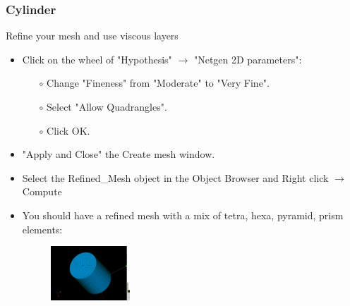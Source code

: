 \documentclass[10pt]{beamer}
\begin{document}
\begin{frame}
\frametitle{Cylinder}
\begin{block}{Refine your mesh and use viscous layers}

\begin{itemize}
\item Click on the wheel of "Hypothesis" $\rightarrow$ "Netgen 2D parameters":
    \begin{itemize}
    \item [$\circ$] Change "Fineness" from "Moderate" to "Very Fine".
    \item [$\circ$] Select "Allow Quadrangles".
    \item [$\circ$] Click OK.
    \end{itemize}
\item "Apply and Close" the Create mesh window.
\item Select the Refined\_Mesh object in the Object Browser and Right click $\rightarrow$ Compute
\item You should have a refined mesh with a mix of tetra, hexa, pyramid, prism elements:

\begin{figure}
\includegraphics[width=0.28\textwidth]{PICTURES/salome6.jpg}
\end{figure}

\end{itemize}

\end{block}
\end{frame}
\end{document}
